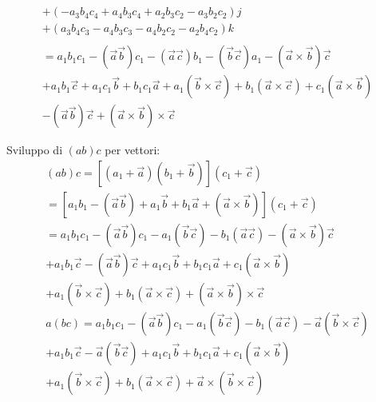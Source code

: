 \documentclass[a4paper,11pt]{article}
\begin{document}
\begin{eqnarray*}
\\
	+( -a_3 b_4 c_4 + a_4 b_3 c_4 + a_2 b_3 c_2 - a_3 b_2 c_2) j
\\
	+ (a_3 b_4 c_3 - a_4 b_3 c_3 -a_4 b_2 c_2- a_2 b_4 c_2) k
\\
\\
	= a_1 b_1 c_1 - \left(\vec a \vec b \right) c_1 - \left(\vec a \vec c \right) b_1 - \left(\vec b \vec c \right) a_1 - \left (\vec a \times \vec b \right) \vec c
\\
	+ a_1 b_1 \vec c + a_1 c_1 \vec b + b_1 c_1 \vec a + a_1 (\vec b \times \vec c) + b_1 (\vec a \times \vec c) + c_1 (\vec a \times \vec b)
\\
	- \left( \vec a \vec b \right) \vec c + \left( \vec a \times \vec b \right) \times \vec c
\end{eqnarray*}

Sviluppo di $(a b) c$ per vettori:
\begin{eqnarray*}
	(a b) c = [(a_1 + \vec a)(b_1 + \vec b)] (c_1 + \vec c)
\\
	= \left[a_1 b_1 - \left( \vec a \vec b \right) + a_1 \vec b + b_1 \vec a + \left( \vec a \times \vec b \right) \right]
	(c_1 + \vec c)
\\
	= a_1 b_1 c_1 - \left( \vec a \vec b \right) c_1 - a_1 \left( \vec b \vec c \right)  - b_1 \left( \vec a \vec c \right) - \left( \vec a \times \vec b \right) \vec c
\\
	+ a_1 b_1 \vec c - \left( \vec a \vec b \right) \vec c + a_1 c_1 \vec b +b_1 c_1 \vec a
	 + c_1 \left( \vec a \times \vec b \right)
\\
	 + a_1 \left( \vec b \times \vec c \right)
	 + b_1 \left( \vec a \times \vec c \right) + \left( \vec a \times \vec b \right) \times \vec c
\\
	a (b c)
	= a_1 b_1 c_1 - \left( \vec a \vec b \right) c_1 - a_1 \left( \vec b \vec c \right)  - b_1 \left( \vec a \vec c \right) - \vec a \left( \vec b \times \vec c \right)
\\
	+ a_1 b_1 \vec c - \vec a \left( \vec b \vec c \right) + a_1 c_1 \vec b +b_1 c_1 \vec a
	 + c_1 \left( \vec a \times \vec b \right)
\\
	 + a_1 \left( \vec b \times \vec c \right)
	 + b_1 \left( \vec a \times \vec c \right) + \vec a \times \left( \vec b \times \vec c \right)
\end{eqnarray*}
\end{document}
